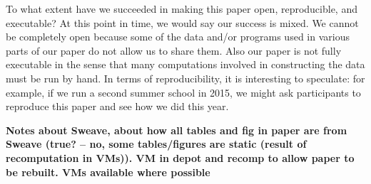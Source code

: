 To what extent have we succeeded in making this paper open,
reproducible, and executable?  At this point in time, we would say our success is mixed.  We cannot be completely open because
some of the data and/or programs used in various parts of our paper do not allow us to share them.  Also our paper is not fully executable in the sense that many 
computations involved in constructing the data must be run by hand.   In terms of reproducibility, it is interesting to speculate: for example, if we run a second summer school in 2015, we might ask participants to reproduce this paper and see how we did this year.



\textbf{Notes about Sweave, about how all tables and fig in paper are from
Sweave (true? -- no, some tables/figures are static (result of recomputation in
VMs)).  
VM in depot and recomp to allow paper to be rebuilt.
VMs available where possible}


